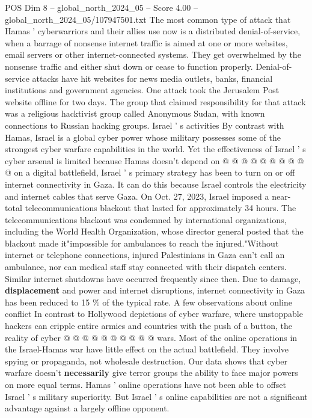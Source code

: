 \begin{textsample}{POS Dim 8 – global\_north\_2024\_05 – Score 4.00 – global\_north\_2024\_05/107947501.txt}
The most common type of attack that Hamas ' cyberwarriors and their allies use now is a distributed denial-of-service, when a barrage of nonsense internet traffic is aimed at one or more websites, email servers or other internet-connected systems.
They get overwhelmed by the nonsense traffic and either shut down or cease to function properly.
Denial-of-service attacks have hit websites for news media outlets, banks, financial institutions and government agencies.
One attack took the Jerusalem Post website offline for two days.
The group that claimed responsibility for that attack was a religious hacktivist group called Anonymous Sudan, with known connections to Russian hacking groups.
Israel ' s activities By contrast with Hamas, Israel is a global cyber power whose military possesses some of the strongest cyber warfare capabilities in the world.
Yet the effectiveness of Israel ' s cyber arsenal is limited because Hamas doesn't depend on @ @ @ @ @ @ @ @ @ @ on a digital battlefield, Israel ' s primary strategy has been to turn on or off internet connectivity in Gaza.
It can do this because Israel controls the electricity and internet cables that serve Gaza.
On Oct. 27, 2023, Israel imposed a near-total telecommunications blackout that lasted for approximately 34 hours.
The telecommunications blackout was condemned by international organizations, including the World Health Organization, whose director general posted that the blackout made it"impossible for ambulances to reach the injured."Without internet or telephone connections, injured Palestinians in Gaza can't call an ambulance, nor can medical staff stay connected with their dispatch centers.
Similar internet shutdowns have occurred frequently since then.
Due to damage, \textbf{displacement} and power and internet disruptions, internet connectivity in Gaza has been reduced to 15 \% of the typical rate.
A few observations about online conflict In contrast to Hollywood depictions of cyber warfare, where unstoppable hackers can cripple entire armies and countries with the push of a button, the reality of cyber @ @ @ @ @ @ @ @ @ @ wars.
Most of the online operations in the Israel-Hamas war have little effect on the actual battlefield.
They involve spying or propaganda, not wholesale destruction.
Our data shows that cyber warfare doesn't \textbf{necessarily} give terror groups the ability to face major powers on more equal terms.
Hamas ' online operations have not been able to offset Israel ' s military superiority.
But Israel ' s online capabilities are not a significant advantage against a largely offline opponent.

\end{textsample}
